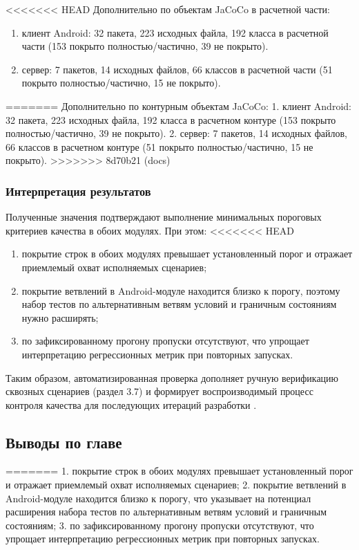 <<<<<<< HEAD
Дополнительно по объектам JaCoCo в расчетной части:
\begin{enumerate}
    \item клиент Android: 32 пакета, 223 исходных файла, 192 класса в расчетной части (153 покрыто полностью/частично, 39 не покрыто).
    \item сервер: 7 пакетов, 14 исходных файлов, 66 классов в расчетной части (51 покрыто полностью/частично, 15 не покрыто).
\end{enumerate}
=======
Дополнительно по контурным объектам JaCoCo:
1. клиент Android: 32 пакета, 223 исходных файла, 192 класса в расчетном контуре (153 покрыто полностью/частично, 39 не покрыто).
2. сервер: 7 пакетов, 14 исходных файлов, 66 классов в расчетном контуре (51 покрыто полностью/частично, 15 не покрыто).
>>>>>>> 8d70b21 (docs)

\subsubsection{Интерпретация результатов}

Полученные значения подтверждают выполнение минимальных пороговых критериев качества в обоих модулях. При этом:
<<<<<<< HEAD
\begin{enumerate}
    \item покрытие строк в обоих модулях превышает установленный порог и отражает приемлемый охват исполняемых сценариев;
    \item покрытие ветвлений в Android-модуле находится близко к порогу, поэтому набор тестов по альтернативным ветвям условий и граничным состояниям нужно расширять;
    \item по зафиксированному прогону пропуски отсутствуют, что упрощает интерпретацию регрессионных метрик при повторных запусках.
\end{enumerate}

Таким образом, автоматизированная проверка дополняет ручную верификацию сквозных сценариев (раздел 3.7) и формирует воспроизводимый процесс контроля качества для последующих итераций разработки .

\subsection{Выводы по главе}
=======
1. покрытие строк в обоих модулях превышает установленный порог и отражает приемлемый охват исполняемых сценариев;
2. покрытие ветвлений в Android-модуле находится близко к порогу, что указывает на потенциал расширения набора тестов по альтернативным ветвям условий и граничным состояниям;
3. по зафиксированному прогону пропуски отсутствуют, что упрощает интерпретацию регрессионных метрик при повторных запусках.

